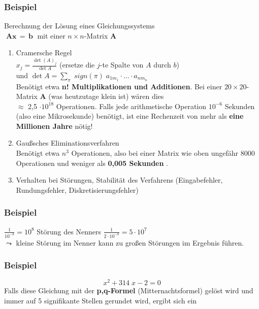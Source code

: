 \documentclass[ngerman,fontsize=11pt, paper=a4, parskip=half, titlepage=true, toc=bib]{scrbook}
\theoremstyle{definition}
\theoremstyle{plain}
\begin{document}
\subsubsection{Beispiel}
Berechnung der Lösung eines Gleichungssystems 
\\ $\; \boldsymbol A \boldsymbol x
\, = \, \boldsymbol b \;$ mit einer $n \times n$-Matrix $\boldsymbol A$
\begin{enumerate}
\item Cramersche Regel\\
  $x_j = \frac{\det  (A)_j}{\det A}$ (ersetze die $j$-te
  Spalte von $A$ durch $b$)\\
  und $\det A = \sum_{\pi} \; sign (\pi) \; a_{1 m_1} \cdot \ldots \cdot a_{n
    m_n}$\\
  Benötigt etwa \textbf{n! Multiplikationen und Additionen}.
  Bei einer $20 \times 20$-Matrix $\boldsymbol A$ (was
  heutzutage klein ist) wären dies \\
  $\approx$ 2,5
  $\cdot 10^{18}$ Operationen. Falls jede
  arithmetische Operation $10^{-6}$ Sekunden (also
  eine Mikrosekunde) benötigt, ist eine Rechenzeit
  von mehr als \textbf{eine Millionen Jahre} nötig!
\item Gaußsches Eliminationsverfahren\\
  Benötigt etwa $n^3$ Operationen, also bei einer Matrix wie oben
  ungefähr 8000 Operationen und weniger als \textbf{0,005 Sekunden}
  \cite[siehe auch][]{golubortega}.
\item Verhalten bei Störungen, Stabilität des Verfahrens
  (Eingabefehler, Rundungsfehler, Diskretisierungsfehler)\\
\end{enumerate}

\subsubsection{Beispiel}
$\frac{1}{10^{-8}} = 10^8$ Störung des Nenners $\frac{1}{2 \cdot 10^{-8}} = 5 \cdot
10^7$\\
$\leadsto$ kleine Störung im Nenner kann zu großen
Störungen im Ergebnis führen.
\\

\subsubsection{Beispiel}
$$x^2 + 314 \; x - 2 = 0$$
Falls diese Gleichung mit der \textbf{p,q-Formel} (Mitternachtsformel)
 gelöst wird und immer auf 5 signifikante Stellen gerundet wird,
ergibt sich ein
\end{document}
